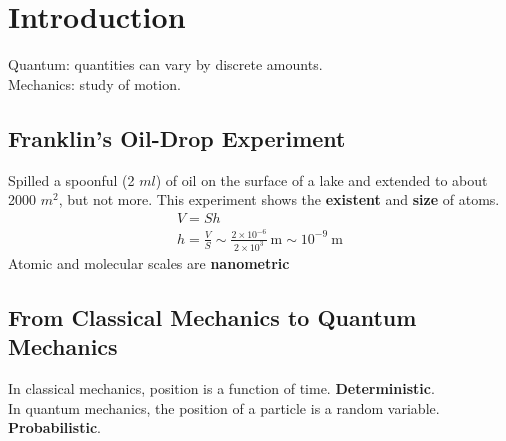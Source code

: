 \section{Introduction}
Quantum: quantities can vary by discrete amounts.\\
Mechanics: study of motion.

\subsection{Franklin's Oil-Drop Experiment}
Spilled a spoonful (2 $ml$) of oil on the surface of a lake and extended to about 2000 $m^2$, but not more.
This experiment shows the \textbf{existent} and \textbf{size} of atoms.
$$
    \begin{gathered}
        V=S h \\
        h=\frac{V}{S} \sim \frac{2 \times 10^{-6}}{2 \times 10^{3}} \mathrm{~m} \sim 10^{-9} \mathrm{~m}
    \end{gathered}
$$
Atomic and molecular scales are \textbf{nanometric}


\subsection{From Classical Mechanics to Quantum Mechanics}
In classical mechanics, position is a function of time. \textbf{Deterministic}.\\
In quantum mechanics, the position of a particle is a random variable. \textbf{Probabilistic}.








